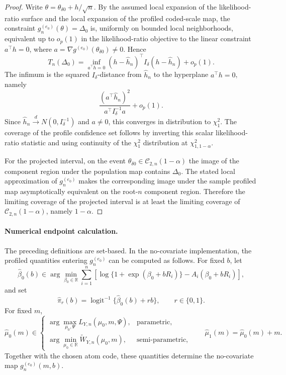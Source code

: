 \documentclass[11pt]{article}
\begin{document}
\begin{proof}
Write $\theta=\theta_{\delta0}+h/\sqrt n$. By the assumed local expansion of the likelihood-ratio surface and the local expansion of the profiled coded-scale map, the constraint $g_n^{(e_0)}(\theta)=\Delta_0$ is, uniformly on bounded local neighborhoods, equivalent up to $o_p(1)$ in the likelihood-ratio objective to the linear constraint $a^\top h=0$, where $a=\nabla g^{(e_0)}(\theta_{\delta0})\neq0$. Hence
\[
  T_n(\Delta_0)
  =
  \inf_{a^\top h=0}
  (h-\widehat h_n)^\top I_\delta(h-\widehat h_n)+o_p(1).
\]
The infimum is the squared $I_\delta$-distance from $\widehat h_n$ to the hyperplane $a^\top h=0$, namely
\[
  \frac{(a^\top \widehat h_n)^2}{a^\top I_\delta^{-1}a}+o_p(1).
\]
Since $\widehat h_n\overset{d}{\to}N(0,I_\delta^{-1})$ and $a\neq0$, this converges in distribution to $\chi^2_1$. The coverage of the profile confidence set follows by inverting this scalar likelihood-ratio statistic and using continuity of the $\chi^2_1$ distribution at $\chi^2_{1,1-\alpha}$.

For the projected interval, on the event $\theta_{\delta0}\in\mathcal C_{2,n}(1-\alpha)$ the image of the component region under the population map contains $\Delta_0$. The stated local approximation of $g_n^{(e_0)}$ makes the corresponding image under the sample profiled map asymptotically equivalent on the root-$n$ component region. Therefore the limiting coverage of the projected interval is at least the limiting coverage of $\mathcal C_{2,n}(1-\alpha)$, namely $1-\alpha$.
\end{proof}

\paragraph{Numerical endpoint calculation.}
The preceding definitions are set-based. In the no-covariate implementation, the profiled quantities entering $g_n^{(e_0)}$ can be computed as follows. For fixed $b$, let
\[
  \widehat{\beta}_0(b)
  \in
  \arg\min_{\beta_0\in\mathbb{R}}
  \sum_{i=1}^n
  \left[
    \log\{1+\exp(\beta_0+bR_i)\}
    -
    A_i(\beta_0+bR_i)
  \right],
\]
and set
\[
  \widehat{\pi}_r(b)
  =
  \operatorname{logit}^{-1}\{\widehat{\beta}_0(b)+rb\},
  \qquad r\in\{0,1\}.
\]
For fixed $m$,
\[
  \widehat{\mu}_0(m)
  \in
  \begin{cases}
    \arg\max\limits_{\mu_0,\Psi} L_{Y,n}(\mu_0,m,\Psi), & \text{parametric},\\[0.8em]
    \arg\min\limits_{\mu_0\in\mathbb{R}} \widetilde{W}_{Y,n}(\mu_0,m), & \text{semi-parametric},
  \end{cases}
  \qquad
  \widehat{\mu}_1(m)=\widehat{\mu}_0(m)+m.
\]
Together with the chosen atom code, these quantities determine the no-covariate map $g_n^{(e_0)}(m,b)$.
\end{document}
